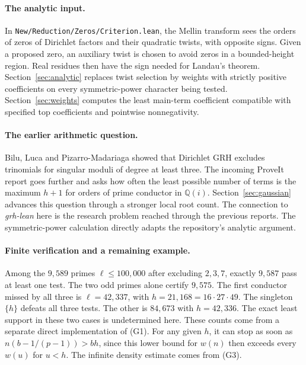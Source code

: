 \documentclass[11pt]{article}
\begin{document}
\paragraph{The analytic input.}
In \texttt{New/Reduction/Zeros/Criterion.lean}, the Mellin transform sees the orders of zeros of Dirichlet factors and their quadratic twists, with opposite signs. Given a proposed zero, an auxiliary twist is chosen to avoid zeros in a bounded-height region. Real residues then have the sign needed for Landau's theorem. Section~\ref{sec:analytic} replaces twist selection by weights with strictly positive coefficients on every symmetric-power character being tested. Section~\ref{sec:weights} computes the least main-term coefficient compatible with specified top coefficients and pointwise nonnegativity.

\paragraph{The earlier arithmetic question.}
Bilu, Luca and Pizarro-Madariaga showed that Dirichlet GRH excludes trinomials for singular moduli of degree at least three.\cite{blp} The incoming ProveIt report goes further and asks how often the least possible number of terms is the maximum $h+1$ for orders of prime conductor in $\mathbb Q(i)$. Section~\ref{sec:gaussian} advances this question through a stronger local root count. The connection to \emph{grh-lean} here is the research problem reached through the previous reports. The symmetric-power calculation directly adapts the repository's analytic argument.\cite{cmprior,deficit}



\paragraph{Finite verification and a remaining example.}
Among the $9{,}589$ primes $\ell\le 100{,}000$ after excluding $2,3,7$, exactly $9{,}587$ pass at least one test. The two odd primes alone certify $9{,}575$. The first conductor missed by all three is $\ell=42{,}337$, with $h=21{,}168=16\cdot27\cdot49$. The singleton $\{h\}$ defeats all three tests. The other is $84{,}673$ with $h=42{,}336$. The exact least support in these two cases is undetermined here. These counts come from a separate direct implementation of (G1). For any given $h$, it can stop as soon as $n(b-1/(p-1))>bh$, since this lower bound for $w(n)$ then exceeds every $w(u)$ for $u<h$. The infinite density estimate comes from (G3).
\end{document}
